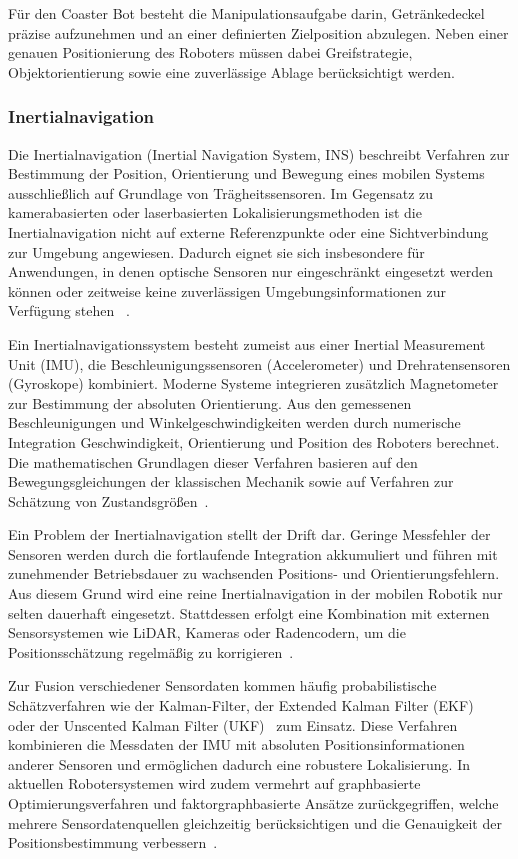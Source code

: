 \documentclass[
  a4paper,
  12pt,
  DIV=12,        %
  parskip=half,  %
  headings=small %
]{scrartcl}
\theoremstyle{definition}
\theoremstyle{definition}
\begin{document}
Für den Coaster Bot besteht die Manipulationsaufgabe darin, Getränkedeckel
präzise aufzunehmen und an einer definierten Zielposition abzulegen. Neben
einer genauen Positionierung des Roboters müssen dabei Greifstrategie,
Objektorientierung sowie eine zuverlässige Ablage berücksichtigt werden.

\subsubsection{Inertialnavigation}

Die Inertialnavigation (Inertial Navigation System, INS) beschreibt Verfahren
zur Bestimmung der Position, Orientierung und Bewegung eines mobilen Systems
ausschließlich auf Grundlage von Trägheitssensoren. Im Gegensatz zu
kamerabasierten oder laserbasierten Lokalisierungsmethoden ist die
Inertialnavigation nicht auf externe Referenzpunkte oder eine Sichtverbindung
zur Umgebung angewiesen. Dadurch eignet sie sich insbesondere für Anwendungen,
in denen optische Sensoren nur eingeschränkt eingesetzt werden können oder
zeitweise keine zuverlässigen Umgebungsinformationen zur Verfügung stehen
~\cite{IntegratedNavigationSystems,ModernRobotics}.

Ein Inertialnavigationssystem besteht zumeist aus einer Inertial
Measurement Unit (IMU), die Beschleunigungssensoren (Accelerometer) und
Drehratensensoren (Gyroskope) kombiniert. Moderne Systeme integrieren
zusätzlich Magnetometer zur Bestimmung der absoluten Orientierung. Aus den
gemessenen Beschleunigungen und Winkelgeschwindigkeiten werden durch numerische
Integration Geschwindigkeit, Orientierung und Position des Roboters berechnet.
Die mathematischen Grundlagen dieser Verfahren basieren auf den
Bewegungsgleichungen der klassischen Mechanik sowie auf Verfahren zur Schätzung
von Zustandsgrößen~\cite{IntegratedNavigationSystems,ModernRobotics}.

Ein Problem der Inertialnavigation stellt der Drift dar. Geringe Messfehler der
Sensoren werden durch die fortlaufende Integration akkumuliert und führen mit
zunehmender Betriebsdauer zu wachsenden Positions- und Orientierungsfehlern.
Aus diesem Grund wird eine reine Inertialnavigation in der mobilen Robotik nur
selten dauerhaft eingesetzt. Stattdessen erfolgt eine Kombination mit externen
Sensorsystemen wie LiDAR, Kameras oder Radencodern, um die Positionsschätzung
regelmäßig zu korrigieren~\cite{IntegratedNavigationSystems,ProbabilisticRobotics}.

Zur Fusion verschiedener Sensordaten kommen häufig probabilistische
Schätzverfahren wie der Kalman-Filter, der Extended Kalman Filter (EKF)~\cite{EKF}
oder der Unscented Kalman Filter (UKF)~\cite{UKF} zum Einsatz. Diese Verfahren
kombinieren die Messdaten der IMU mit absoluten Positionsinformationen anderer
Sensoren und ermöglichen dadurch eine robustere Lokalisierung. In aktuellen
Robotersystemen wird zudem vermehrt auf graphbasierte Optimierungsverfahren und
faktorgraphbasierte Ansätze zurückgegriffen, welche mehrere Sensordatenquellen
gleichzeitig berücksichtigen und die Genauigkeit der Positionsbestimmung
verbessern~\cite{ProbabilisticRobotics,HoB}.
\end{document}
